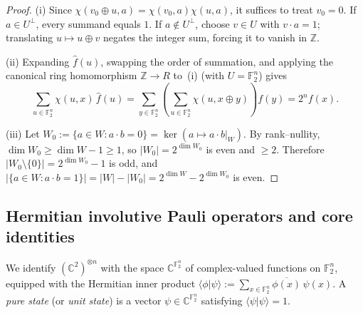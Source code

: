 \documentclass[11pt,a4paper]{article}
\theoremstyle{plain}
\theoremstyle{definition}
\theoremstyle{remark}
\newcommand{\C}{\mathbb{C}}
\newcommand{\Z}{\mathbb{Z}}
\newcommand{\F}{\mathbb{F}}
\newcommand{\braket}[2]{\langle#1|#2\rangle}
\newcommand{\abs}[1]{\lvert#1\rvert}
\numberwithin{equation}{section}
\begin{document}
\begin{proof}
(i) Since $\chi(v_0 \oplus u, a) = \chi(v_0, a)\chi(u, a)$, it suffices to treat $v_0 = 0$. If $a \in U^\perp$, every summand equals $1$. If $a \notin U^\perp$, choose $v \in U$ with $v \cdot a = 1$; translating $u \mapsto u \oplus v$ negates the integer sum, forcing it to vanish in $\Z$.

(ii) Expanding $\widehat{f}(u)$, swapping the order of summation, and applying the canonical ring homomorphism $\Z \to R$ to~(i) (with $U = \F_2^n$) gives
\[
  \sum_{u \in \F_2^n} \chi(u, x)\,\widehat{f}(u) = \sum_{y \in \F_2^n} \left(\sum_{u \in \F_2^n} \chi(u, x \oplus y)\right) f(y) = 2^n f(x).
\]

(iii) Let $W_0 := \{a \in W : a \cdot b = 0\} = \ker(a \mapsto a \cdot b\vert_W)$. By rank--nullity, $\dim W_0 \ge \dim W - 1 \ge 1$, so $\abs{W_0} = 2^{\dim W_0}$ is even and $\ge 2$. Therefore $\abs{W_0 \setminus \{0\}} = 2^{\dim W_0} - 1$ is odd, and $\abs{\{a \in W : a \cdot b = 1\}} = \abs{W} - \abs{W_0} = 2^{\dim W} - 2^{\dim W_0}$ is even.
\end{proof}

\subsection{Hermitian involutive Pauli operators and core identities}

We identify $(\C^2)^{\otimes n}$ with the space $\C^{\F_2^n}$ of complex-valued functions on $\F_2^n$, equipped with the Hermitian inner product $\braket{\phi}{\psi} := \sum_{x \in \F_2^n} \overline{\phi(x)}\,\psi(x)$. A \emph{pure state} (or \emph{unit state}) is a vector $\psi \in \C^{\F_2^n}$ satisfying $\braket{\psi}{\psi} = 1$.
\end{document}
